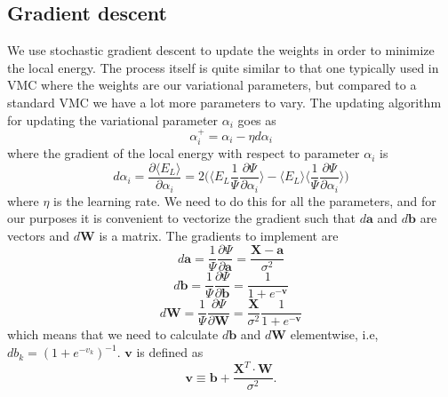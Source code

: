 \documentclass[norsk,a4paper,12pt]{article}
\begin{document}
\subsection{Gradient descent}
We use stochastic gradient descent to update the weights in order to minimize the local energy. The process itself is quite similar to that one typically used in VMC where the weights are our variational parameters, but compared to a standard VMC we have a lot more parameters to vary. The updating algorithm for updating the variational parameter $\alpha_i$ goes as
\begin{equation}
\alpha_i^+=\alpha_i-\eta d\alpha_i
\end{equation}
where the gradient of the local energy with respect to parameter $\alpha_i$ is
\begin{equation}
d\alpha_i=\frac{\partial\langle E_L\rangle}{\partial \alpha_i}=2\bigg(\Big\langle E_L\frac{1}{\Psi}\frac{\partial\Psi}{\partial\alpha_i}\Big\rangle-\Big\langle E_L\Big\rangle\Big\langle\frac{1}{\Psi}\frac{\partial\Psi}{\partial\alpha_i}\Big\rangle\bigg)
\end{equation}
where $\eta$ is the learning rate. We need to do this for all the parameters, and for our purposes it is convenient to vectorize the gradient such that $d\boldsymbol{a}$ and $d\boldsymbol{b}$ are vectors and $d\boldsymbol{W}$ is a matrix. The gradients to implement are
\begin{equation}
d\boldsymbol{a}=\frac{1}{\Psi}\frac{\partial\Psi}{\partial\boldsymbol{a}}=\frac{\boldsymbol{X}-\boldsymbol{a}}{\sigma^2}
\end{equation}
\begin{equation}
d\boldsymbol{b}=\frac{1}{\Psi}\frac{\partial\Psi}{\partial\boldsymbol{b}}=\frac{1}{1+e^{-\boldsymbol{v}}}
\end{equation}
\begin{equation}
d\boldsymbol{W}=\frac{1}{\Psi}\frac{\partial\Psi}{\partial\boldsymbol{W}}=\frac{\boldsymbol{X}}{\sigma^2}\frac{1}{1+e^{-\boldsymbol{v}}}
\end{equation}
which means that we need to calculate $d\boldsymbol{b}$ and $d\boldsymbol{W}$ elementwise, i.e, $db_k=(1+e^{-v_k})^{-1}$. $\boldsymbol{v}$ is defined as
\begin{equation}
\boldsymbol{v}\equiv \boldsymbol{b} + \frac{\boldsymbol{X}^T\cdot\boldsymbol{W}}{\sigma^2}.
\end{equation}
\end{document}
